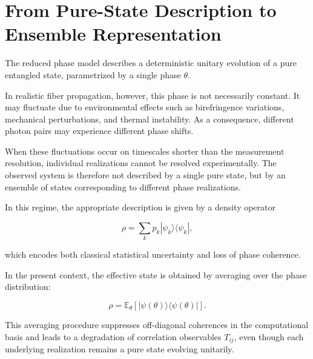 
\section{From Pure-State Description to Ensemble Representation}

The reduced phase model describes a deterministic unitary evolution of a pure entangled state, parametrized by a single phase \( \theta \).

In realistic fiber propagation, however, this phase is not necessarily constant. It may fluctuate due to environmental effects such as birefringence variations, mechanical perturbations, and thermal instability. As a consequence, different photon pairs may experience different phase shifts.

\medskip

When these fluctuations occur on timescales shorter than the measurement resolution, individual realizations cannot be resolved experimentally. The observed system is therefore not described by a single pure state, but by an ensemble of states corresponding to different phase realizations.

\medskip

In this regime, the appropriate description is given by a density operator

\begin{equation}
\rho
=
\sum_k p_k
|\psi_k\rangle\langle\psi_k|,
\label{eq:ensemble_density_operator}
\end{equation}

which encodes both classical statistical uncertainty and loss of phase coherence.

\medskip

In the present context, the effective state is obtained by averaging over the phase distribution:

\begin{equation}
\rho
=
\mathbb{E}_{\theta}
\left[
|\psi(\theta)\rangle\langle\psi(\theta)|
\right].
\label{eq:phase_ensemble_density_operator}
\end{equation}

This averaging procedure suppresses off-diagonal coherences in the computational basis and leads to a degradation of correlation observables \( T_{ij} \), even though each underlying realization remains a pure state evolving unitarily.

